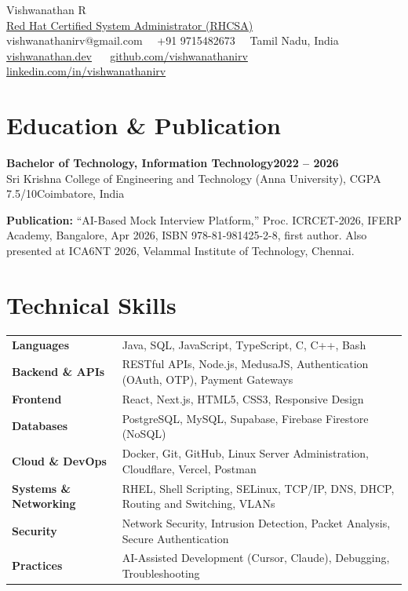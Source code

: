 \documentclass[10pt,a4paper]{article}
\newcommand{\entry}[2]{\textbf{#1}\hfill\textbf{#2}\\}
\newcommand{\sub}[2]{#1\hfill#2\par}
\newcommand{\skillrow}[2]{\textbf{#1} & #2 \\[0.15ex]}
\newcommand{\sep}{\ {\color{theme}\textbar}\ }
\begin{document}
\begin{center}
  {\color{theme}\Huge Vishwanathan R}\\[0.5ex]
  {\large \href{https://www.credly.com/badges/f35e390a-d50b-4a5c-b26b-937e6cc675c3/public_url}{Red Hat Certified System Administrator (RHCSA)}}\\[0.6ex]
  vishwanathanirv@gmail.com \sep +91 9715482673 \sep Tamil Nadu, India\\[0.3ex]
  \href{https://vishwanathan.dev}{\webicon vishwanathan.dev} \sep
  \href{https://github.com/vishwanathanirv}{\ghicon github.com/vishwanathanirv} \sep
  \href{https://www.linkedin.com/in/vishwanathanirv}{\inicon linkedin.com/in/vishwanathanirv}
\end{center}
\vspace{-1.2ex}

\section{Education \& Publication}
\entry{Bachelor of Technology, Information Technology}{2022 -- 2026}
\sub{Sri Krishna College of Engineering and Technology (Anna University), CGPA 7.5/10}{Coimbatore, India}
\vspace{0.4ex}\textbf{Publication:} ``AI-Based Mock Interview Platform,'' Proc. ICRCET-2026, IFERP Academy, Bangalore, Apr 2026, ISBN 978-81-981425-2-8, first author. Also presented at ICA6NT 2026, Velammal Institute of Technology, Chennai.


\section{Technical Skills}
\begin{tabularx}{\textwidth}{@{}l X@{}}
\skillrow{Languages}{Java, SQL, JavaScript, TypeScript, C, C++, Bash}
\skillrow{Backend \& APIs}{RESTful APIs, Node.js, MedusaJS, Authentication (OAuth, OTP), Payment Gateways}
\skillrow{Frontend}{React, Next.js, HTML5, CSS3, Responsive Design}
\skillrow{Databases}{PostgreSQL, MySQL, Supabase, Firebase Firestore (NoSQL)}
\skillrow{Cloud \& DevOps}{Docker, Git, GitHub, Linux Server Administration, Cloudflare, Vercel, Postman}
\skillrow{Systems \& Networking}{RHEL, Shell Scripting, SELinux, TCP/IP, DNS, DHCP, Routing and Switching, VLANs}
\skillrow{Security}{Network Security, Intrusion Detection, Packet Analysis, Secure Authentication}
\skillrow{Practices}{AI-Assisted Development (Cursor, Claude), Debugging, Troubleshooting}
\end{tabularx}
\end{document}
